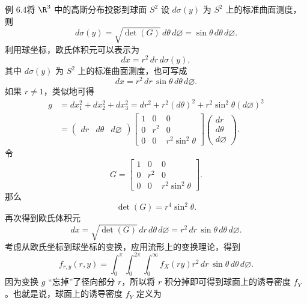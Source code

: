 \begin{statement}{例 6.4}{将 $\R^3$ 中的高斯分布投影到球面 $S^2$}
设 $d\sigma(y)$ 为 $S^2$ 上的标准曲面测度，则
\[
  d\sigma(y)=\sqrt{\det(G)}\,d\theta\,d\varnothing=\sin\theta\,d\theta\,d\varnothing.
\]
利用球坐标，欧氏体积元可以表示为
\[
  dx=r^2\,dr\,d\sigma(y),
\]
其中 $d\sigma(y)$ 为 $S^2$ 上的标准曲面测度，也可写成
\begin{equation*}
  dx=r^2\,dr\,\sin\theta\,d\theta\,d\varnothing.
  \tag{6.18}\label{eq:6.18}
\end{equation*}
如果 $r\ne 1$，类似地可得
\begin{equation*}
  \begin{aligned}
    g&=dx_1^2+dx_2^2+dx_3^2=dr^2+r^2(d\theta)^2+r^2\sin^2\theta(d\varnothing)^2\\
     &=\begin{pmatrix}dr&d\theta&d\varnothing\end{pmatrix}
       \begin{bmatrix}1&0&0\\0&r^2&0\\0&0&r^2\sin^2\theta\end{bmatrix}
       \begin{pmatrix}dr\\d\theta\\d\varnothing\end{pmatrix}.
  \end{aligned}
  \tag{6.19}\label{eq:6.19}
\end{equation*}
令
\begin{equation*}
  G=\begin{bmatrix}1&0&0\\0&r^2&0\\0&0&r^2\sin^2\theta\end{bmatrix}.
  \tag{6.20}\label{eq:6.20}
\end{equation*}
那么
\[
  \det(G)=r^4\sin^2\theta.
\]
再次得到欧氏体积元
\begin{equation*}
  dx=\sqrt{\det(G)}\,dr\,d\theta\,d\varnothing
    =r^2\,dr\,\sin\theta\,d\theta\,d\varnothing.
  \tag{6.21}\label{eq:6.21}
\end{equation*}
考虑从欧氏坐标到球坐标的变换，应用流形上的变换理论，得到
\begin{equation*}
  f_{r,y}(r,y)=\int_0^\pi\int_0^{2\pi}\int_0^\infty
    f_X(ry)r^2\,dr\,\sin\theta\,d\theta\,d\varnothing.
  \tag{6.22}\label{eq:6.22}
\end{equation*}
因为变换 $g$ “忘掉”了径向部分 $r$，所以将 $r$ 积分掉即可得到球面上的诱导密度 $f_Y$。也就是说，球面上的诱导密度 $f_Y$ 定义为

\end{statement}
